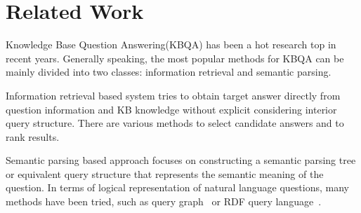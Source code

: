 \section{Related Work}




Knowledge Base Question Answering(KBQA) has been a hot research top in recent years.  Generally speaking,  the most popular methods for KBQA can be mainly divided into two classes: information retrieval and semantic parsing. 

Information retrieval based system tries to obtain target answer directly from question information and KB knowledge without explicit considering interior query structure.
There are various methods \cite{yao2014information,bordes2015large,dong2015question,xu2016question} to select candidate answers and to rank results.  

Semantic parsing based approach focuses on constructing a semantic parsing tree or equivalent query structure that represents the semantic meaning of the question.  In terms of logical representation of natural language questions,  many methods have been tried,  such as query graph~\cite{yih2014semantic,yih2015semantic} or RDF query language~\cite{unger2012template,cui2017kbqa,hu2018answering}.  


